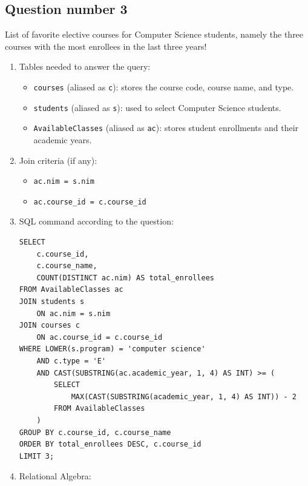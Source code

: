 \subsection{Question number 3}

\begin{tcolorbox}
    List of favorite elective courses for Computer Science students, namely the three courses with the most enrollees in the last three years!
\end{tcolorbox}

\begin{enumerate}
    \itemsep0em
    \item Tables needed to answer the query:
    \begin{itemize}
        \item \texttt{courses} (aliased as \texttt{c}): stores the course code, course name, and type.
        \item \texttt{students} (aliased as \texttt{s}): used to select Computer Science students.
        \item \texttt{AvailableClasses} (aliased as \texttt{ac}): stores student enrollments and their academic years.
    \end{itemize}

    \item Join criteria (if any):
    \begin{itemize}
        \item \texttt{ac.nim = s.nim}
        \item \texttt{ac.course\_id = c.course\_id}
    \end{itemize}

    \item SQL command according to the question:
    \begin{lstlisting}
SELECT
    c.course_id,
    c.course_name,
    COUNT(DISTINCT ac.nim) AS total_enrollees
FROM AvailableClasses ac
JOIN students s
    ON ac.nim = s.nim
JOIN courses c
    ON ac.course_id = c.course_id
WHERE LOWER(s.program) = 'computer science'
    AND c.type = 'E'
    AND CAST(SUBSTRING(ac.academic_year, 1, 4) AS INT) >= (
        SELECT
            MAX(CAST(SUBSTRING(academic_year, 1, 4) AS INT)) - 2
        FROM AvailableClasses
    )
GROUP BY c.course_id, c.course_name
ORDER BY total_enrollees DESC, c.course_id
LIMIT 3;
    \end{lstlisting}

    \item Relational Algebra:


\end{enumerate}
